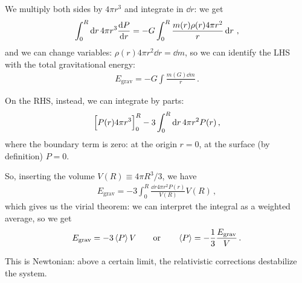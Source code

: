 \documentclass[main.tex]{subfiles}
\begin{document}
We multiply both sides by \(4 \pi r^3\) and integrate in \(\dd{r}\): we get 
%
\begin{align}
  \int_0^{R} \dd{r} 4 \pi r^3 \dv{P}{r} = 
  - G \int_{0}^{R} \frac{m(r) \rho (r) 4 \pi r^2}{r} \dd{r}
\,,
\end{align}
%
and we can change variables: \(\rho (r) 4 \pi r^2 \dd{r} = \dd{m }\), so we can identify the LHS with the total gravitational energy: 
%
\begin{align}
E _{\text{grav}} = -G \int \frac{m(G) \dd{m}}{r} 
\,. 
\end{align}

On the RHS, instead, we can integrate by parts: 
%
\begin{align}
  \qty[P(r) 4 \pi r^3]_0^{R} - 3 \int_{0}^{R} \dd{r} 4 \pi r^2 P(r)
\,,
\end{align}
%
where the boundary term is zero: at the origin \(r =0\), at the surface (by definition) \(P =0\).

So, inserting the volume \(V(R) \equiv 4 \pi R^3/3\), we have 
%
\begin{align}
  E _{\text{grav}} = - 3 \int_{0}^{R} \frac{ \dd{r} 4 \pi r^2   P(r)}{V(R)} V(R)
\,,
\end{align}
%
which gives us the virial theorem: we can interpret the integral as a weighted average, so we get 
%
\begin{align}
  E _{\text{grav}} = - 3 \expval{P} V 
  \qquad 
  \text{or} 
  \qquad 
  \expval{P} = -\frac{1}{3} \frac{E _{\text{grav}}}{V}
\,.
\end{align}

This is Newtonian: above a certain limit, the relativistic corrections destabilize the system. 
\end{document}
